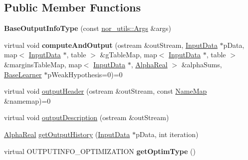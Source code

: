\subsection*{Public Member Functions}
\begin{DoxyCompactItemize}
\item 
\hypertarget{classMultiBoost_1_1BaseOutputInfoType_ae36d8cf7aea735d6d250910154326c92}{{\bfseries Base\-Output\-Info\-Type} (const \hyperlink{classnor__utils_1_1Args}{nor\-\_\-utils\-::\-Args} \&args)}\label{classMultiBoost_1_1BaseOutputInfoType_ae36d8cf7aea735d6d250910154326c92}

\item 
\hypertarget{classMultiBoost_1_1BaseOutputInfoType_a8037cd83c1f85ebcb2eefa8501e705de}{virtual void {\bfseries compute\-And\-Output} (ostream \&out\-Stream, \hyperlink{classMultiBoost_1_1InputData}{Input\-Data} $\ast$p\-Data, map$<$ \hyperlink{classMultiBoost_1_1InputData}{Input\-Data} $\ast$, table $>$ \&g\-Table\-Map, map$<$ \hyperlink{classMultiBoost_1_1InputData}{Input\-Data} $\ast$, table $>$ \&margins\-Table\-Map, map$<$ \hyperlink{classMultiBoost_1_1InputData}{Input\-Data} $\ast$, \hyperlink{Defaults_8h_a80184c4fd10ab70a1a17c5f97dcd1563}{Alpha\-Real} $>$ \&alpha\-Sums, \hyperlink{classMultiBoost_1_1BaseLearner}{Base\-Learner} $\ast$p\-Weak\-Hypothesis=0)=0}\label{classMultiBoost_1_1BaseOutputInfoType_a8037cd83c1f85ebcb2eefa8501e705de}

\item 
virtual void \hyperlink{classMultiBoost_1_1BaseOutputInfoType_aec8678cadeec12db720af8b482c63662}{output\-Header} (ostream \&out\-Stream, const \hyperlink{classMultiBoost_1_1NameMap}{Name\-Map} \&namemap)=0
\item 
virtual void \hyperlink{classMultiBoost_1_1BaseOutputInfoType_aa2f886100b21c8cf09d5dddc9e4d1dca}{output\-Description} (ostream \&out\-Stream)
\item 
\hyperlink{Defaults_8h_a80184c4fd10ab70a1a17c5f97dcd1563}{Alpha\-Real} \hyperlink{classMultiBoost_1_1BaseOutputInfoType_a099fffb75ac734da9bb014590d4b7b7c}{get\-Output\-History} (\hyperlink{classMultiBoost_1_1InputData}{Input\-Data} $\ast$p\-Data, int iteration)
\item 
\hypertarget{classMultiBoost_1_1BaseOutputInfoType_a534836b4bcbc753e8f9c5b349d0cfc64}{virtual O\-U\-T\-P\-U\-T\-I\-N\-F\-O\-\_\-\-O\-P\-T\-I\-M\-I\-Z\-A\-T\-I\-O\-N {\bfseries get\-Optim\-Type} ()}\label{classMultiBoost_1_1BaseOutputInfoType_a534836b4bcbc753e8f9c5b349d0cfc64}

\end{DoxyCompactItemize}
